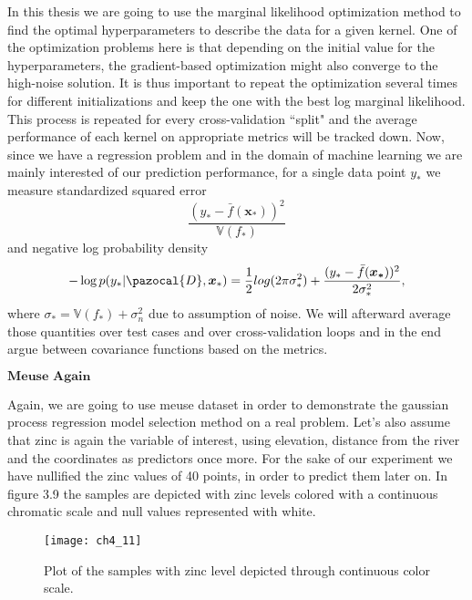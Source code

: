 \documentclass[12pt,a4paper,oneside]{book}
\theoremstyle{plain}
\theoremstyle{definition}
\begin{document}
{\vspace{3mm}
\noindent
In this thesis we are going to use the marginal likelihood optimization method to find the optimal hyperparameters to describe the data for a given kernel. One of the optimization problems here is that depending on the initial value for the hyperparameters, the gradient-based optimization might also converge to the high-noise solution. It is thus important to repeat the optimization several times for different initializations and keep the one with the best log marginal likelihood.  This process is repeated for every cross-validation ``split" and the average performance of each kernel on appropriate metrics will be tracked down. Now, since we have a regression problem and in the domain of machine learning we are mainly interested of our prediction performance, for a single data point $y_*$ we measure standardized squared error $$\frac{(y_*-\bar{f}(\bm{x_*}))^2}{\mathbb{V}(f_*)}$$   and negative log probability density $$-\log p (y_*|\pazocal{D},\bm{x}_*)=\frac{1}{2}log(2\pi\sigma_*^2)+\frac{(y_*-\bar{f}(\bm{x_*}))^2}{2\sigma_*^2},$$ where $\sigma_*=\mathbb{V}(f_*)+\sigma_n^2$ due to assumption of noise. We will afterward average those quantities over test cases and over cross-validation loops and in the end argue between covariance functions based on the metrics. 
\vspace{3mm}
\begin{flushleft}
$\textbf{Meuse Again}$
\end{flushleft}
\vspace{3mm}
Again, we are going to use meuse dataset in order to demonstrate the gaussian process regression model selection method on a real problem. Let's also assume that zinc is again the variable of interest, using elevation, distance from the river and the coordinates as predictors once more. 
For the sake of our experiment we have nullified the zinc values of 40 points, in order to predict them later on. In figure 3.9 the samples are depicted with zinc levels colored with a continuous chromatic scale and null values represented with white. 
\begin{figure}[h]
\begin{center}
\texttt{[image: ch4\_11]}
\end{center}
\caption{Plot of the samples with zinc level depicted through continuous color scale.}
\end{figure}
}
\end{document}
